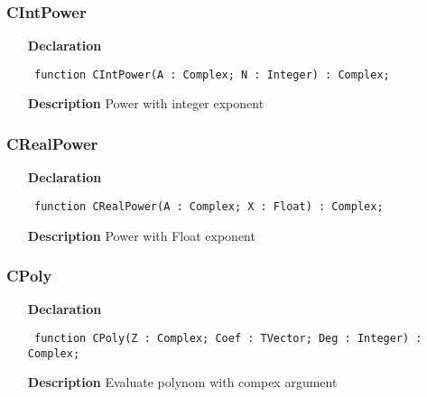 \documentclass[12pt,a4paper,oneside]{report}
\newcommand{\declarationitem}[1]{\textbf{#1}}
\newcommand{\descriptiontitle}[1]{\textbf{#1}}
\newcommand{\code}[1]{\texttt{#1}}
\begin{document}
\subsubsection{CIntPower}
\label{ucomplex-CIntPower}
\begin{itemize}\item[\declarationitem{Declaration}\hfill]
\begin{flushleft}
\code{
function CIntPower(A : Complex; N : Integer) : Complex;}

\end{flushleft}

\par
\item[\descriptiontitle{Description}]
Power with integer exponent

\end{itemize}
\subsubsection{CRealPower}
\label{ucomplex-CRealPower}
\begin{itemize}\item[\declarationitem{Declaration}\hfill]
\begin{flushleft}
\code{
function CRealPower(A : Complex; X : Float) : Complex;}

\end{flushleft}

\par
\item[\descriptiontitle{Description}]
Power with Float exponent

\end{itemize}
\subsubsection{CPoly}
\label{ucomplex-CPoly}
\begin{itemize}\item[\declarationitem{Declaration}\hfill]
\begin{flushleft}
\code{
function CPoly(Z : Complex; Coef : TVector; Deg : Integer) : Complex;}

\end{flushleft}

\par
\item[\descriptiontitle{Description}]
Evaluate polynom with compex argument

\end{itemize}
\end{document}
